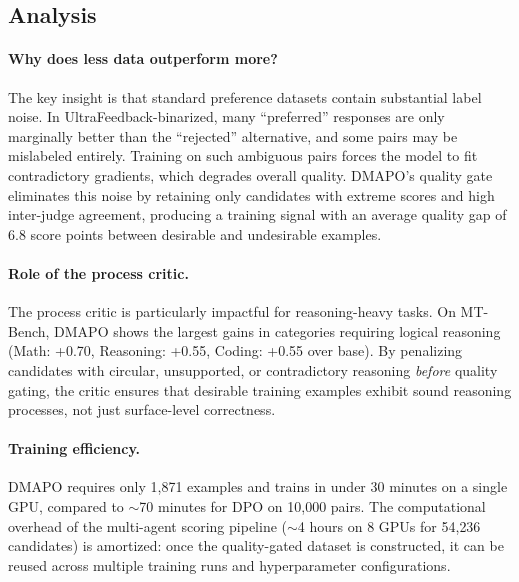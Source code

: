\documentclass[10pt,twocolumn]{article}
\newcommand{\ours}{\textsc{DMAPO}}
\begin{document}
%
%

\subsection{Analysis}
\label{sec:analysis}

\paragraph{Why does less data outperform more?}
The key insight is that standard preference datasets contain substantial label noise.
In UltraFeedback-binarized, many ``preferred'' responses are only marginally better than the ``rejected'' alternative, and some pairs may be mislabeled entirely.
Training on such ambiguous pairs forces the model to fit contradictory gradients, which degrades overall quality.
\ours{}'s quality gate eliminates this noise by retaining only candidates with extreme scores and high inter-judge agreement, producing a training signal with an average quality gap of 6.8 score points between desirable and undesirable examples.

\paragraph{Role of the process critic.}
The process critic is particularly impactful for reasoning-heavy tasks.
On MT-Bench, \ours{} shows the largest gains in categories requiring logical reasoning (Math: +0.70, Reasoning: +0.55, Coding: +0.55 over base).
By penalizing candidates with circular, unsupported, or contradictory reasoning \emph{before} quality gating, the critic ensures that desirable training examples exhibit sound reasoning processes, not just surface-level correctness.

\paragraph{Training efficiency.}
\ours{} requires only 1{,}871 examples and trains in under 30 minutes on a single GPU, compared to $\sim$70 minutes for DPO on 10{,}000 pairs.
The computational overhead of the multi-agent scoring pipeline ($\sim$4 hours on 8 GPUs for 54{,}236 candidates) is amortized: once the quality-gated dataset is constructed, it can be reused across multiple training runs and hyperparameter configurations.


% 
% 
\end{document}
